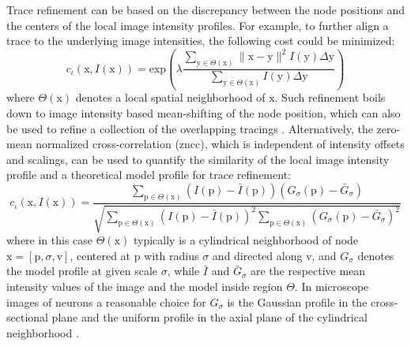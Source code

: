 Trace refinement can be based on the discrepancy between the node positions and the centers of the local image intensity profiles. For example, to further align a trace to the underlying image intensities, the following cost could be minimized:
\begin{equation}
c_{\iota}(\mathrm{x}, I(\mathrm{x})) = \text{exp} \left( \lambda \frac{ \sum\nolimits_{\mathrm{y} \in \Theta(\mathrm{x})} \lVert \mathrm{x} - \mathrm{y} \rVert^2 I(\mathrm{y}) \Delta\mathrm{y}  }{\sum\nolimits_{\mathrm{y} \in \Theta(\mathrm{x})} I(\mathrm{y}) \Delta\mathrm{y} } \right) 
\label{ch1_eq2}
\end{equation}
where $\Theta(\mathrm{x})$ denotes a local spatial neighborhood of $\mathrm{x}$. Such refinement boils down to image intensity based mean-shifting \cite{cheng1995mean} of the node position, which can also be used to refine a collection of the overlapping tracings \cite{radojevic-pnr}. Alternatively, the zero-mean normalized cross-correlation (\gls{zncc}), which is independent of intensity offsets and scalings, can be used to quantify the similarity of the local image intensity profile and a theoretical model profile for trace refinement:
\begin{equation}
c_{\iota}(\mathrm{x}, I(\mathrm{x})) = \frac{ \sum\limits_{\mathrm{p} \in \Theta(\mathrm{x})} (I(\mathrm{p}) - \bar{I}(\mathrm{p}))(G_{\sigma}(\mathrm{p}) - \bar{G}_{\sigma}) }{ \sqrt{ \sum\limits_{\mathrm{p} \in \Theta(\mathrm{x})}(I(\mathrm{p}) - \bar{I}(\mathrm{p}))^2 \sum\limits_{\mathrm{p} \in \Theta(\mathrm{x})}(G_{\sigma}(\mathrm{p}) - \bar{G}_{\sigma})^2 } }
\label{ch1_eq1}
\end{equation}
where in this case $\Theta(\mathrm{x})$ typically is a cylindrical neighborhood of node $\mathrm{x} = [ \mathrm{p}, \sigma, \mathrm{v} ]$, centered at $\mathrm{p}$ with radius $\sigma$ and directed along $\mathrm{v}$, and $G_{\sigma}$ denotes the model profile at given scale $\sigma$, while $\bar{I}$ and $\bar{G}_{\sigma}$ are the respective mean intensity values of the image and the model inside region $\Theta$. In microscope images of neurons a reasonable choice for $G_{\sigma}$ is the Gaussian profile in the cross-sectional plane and the uniform profile in the axial plane of the cylindrical neighborhood \cite{radojevic2017neuron}. 

